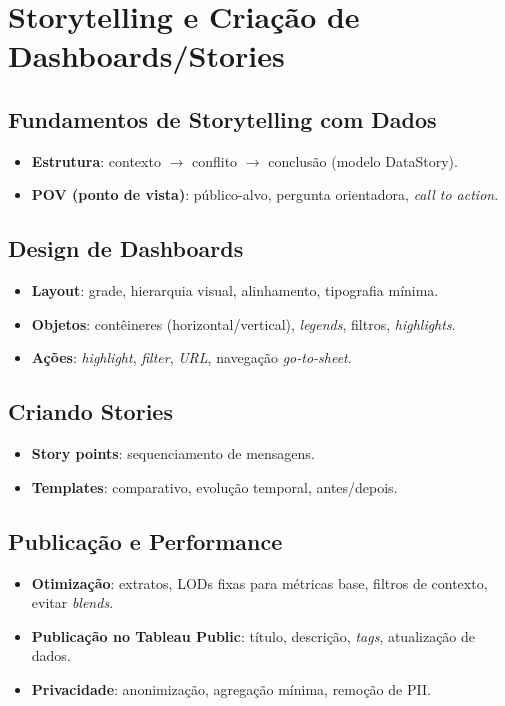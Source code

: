 

\chapter{Storytelling e Criação de Dashboards/Stories} %

\section{Fundamentos de Storytelling com Dados}
\begin{itemize}[leftmargin=*]
  \item \textbf{Estrutura}: contexto $\rightarrow$ conflito $\rightarrow$ conclusão (modelo DataStory).
  \item \textbf{POV (ponto de vista)}: público-alvo, pergunta orientadora, \textit{call to action}.
\end{itemize}

\section{Design de Dashboards}
\begin{itemize}[leftmargin=*]
  \item \textbf{Layout}: grade, hierarquia visual, alinhamento, tipografia mínima.
  \item \textbf{Objetos}: contêineres (horizontal/vertical), \textit{legends}, filtros, \textit{highlights}.
  \item \textbf{Ações}: \textit{highlight}, \textit{filter}, \textit{URL}, navegação \textit{go-to-sheet}.
\end{itemize}

\section{Criando Stories}
\begin{itemize}[leftmargin=*]
  \item \textbf{Story points}: sequenciamento de mensagens.
  \item \textbf{Templates}: comparativo, evolução temporal, antes/depois.
\end{itemize}

\section{Publicação e Performance}
\begin{itemize}[leftmargin=*]
  \item \textbf{Otimização}: extratos, LODs fixas para métricas base, filtros de contexto, evitar \textit{blends}.
  \item \textbf{Publicação no Tableau Public}: título, descrição, \textit{tags}, atualização de dados.
  \item \textbf{Privacidade}: anonimização, agregação mínima, remoção de PII.
\end{itemize}

